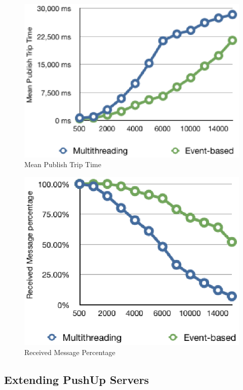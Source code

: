 \begin{figure}[htb!]
\centering%
    \includegraphics[scale=0.70]{figures/et_latency.eps}
    \caption{Mean Publish Trip Time}
    \label{fig:et_latency}
\end{figure}

\begin{figure}[htb!]
\centering%
    \includegraphics[scale=0.70]{figures/et_rate.eps}
    \caption{Received Message Percentage}
    \label{fig:et_rate}
\end{figure}


\subsection{Extending PushUp Servers\\}

